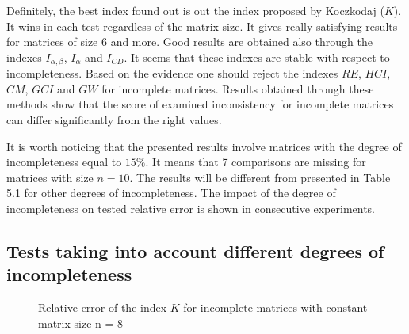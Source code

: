 Definitely, the best index found out is out the index proposed by Koczkodaj ($K$). It wins in each test regardless of the matrix size. It gives really satisfying results for matrices of size 6 and more. Good results are obtained also through the indexes $I_{\alpha,\beta}$, $I_{\alpha}$ and $I_{CD}$. It seems that these indexes are stable with respect to incompleteness. Based on the evidence one should reject the indexes $\textit{RE}$, $\textit{HCI}$, $\textit{CM}$, $\textit{GCI}$ and $\textit{GW}$ for incomplete matrices. Results obtained through these methods show that the score of examined inconsistency for incomplete matrices can differ significantly from the right values.

It is worth noticing that the presented results involve matrices with the degree of incompleteness equal to $15\%$. It means that 7 comparisons are missing for matrices with size $n = 10$. The results will be different from presented in Table 5.1 for other degrees of incompleteness. The impact of the degree of incompleteness on tested relative error is shown in consecutive experiments.

\subsection{Tests taking into account different degrees of incompleteness}

\begin{figure}[h]
  \begin{center}
\caption{Relative error of the index $K$ for incomplete matrices with constant matrix size n = 8}
\end{center}
\end{figure}

